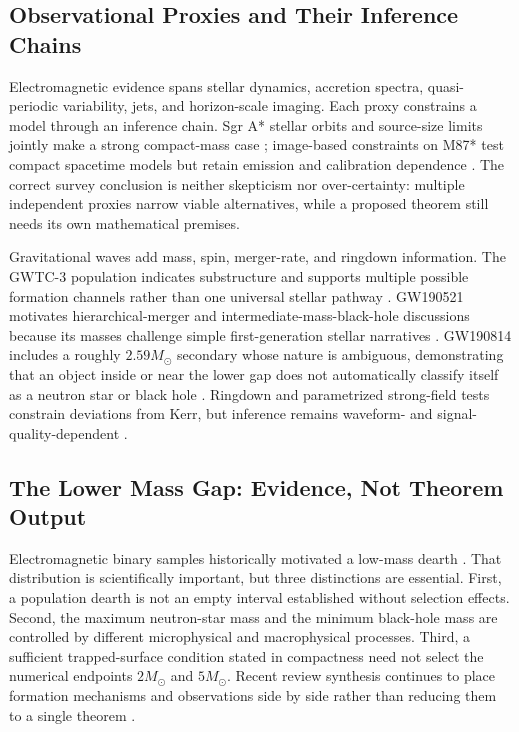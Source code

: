 \documentclass[conference]{IEEEtran}
\newcommand{\Msun}{M_{\odot}}
\begin{document}
\subsection{Observational Proxies and Their Inference Chains}
Electromagnetic evidence spans stellar dynamics, accretion spectra, quasi-periodic variability, jets, and horizon-scale imaging. Each proxy constrains a model through an inference chain. Sgr A* stellar orbits and source-size limits jointly make a strong compact-mass case \cite{genzel2010}; image-based constraints on M87* test compact spacetime models but retain emission and calibration dependence \cite{kocherlakota2021}. The correct survey conclusion is neither skepticism nor over-certainty: multiple independent proxies narrow viable alternatives, while a proposed theorem still needs its own mathematical premises.

Gravitational waves add mass, spin, merger-rate, and ringdown information. The GWTC-3 population indicates substructure and supports multiple possible formation channels rather than one universal stellar pathway \cite{abbott2023gwtc3}. GW190521 motivates hierarchical-merger and intermediate-mass-black-hole discussions because its masses challenge simple first-generation stellar narratives \cite{abbott2020gw190521}. GW190814 includes a roughly $2.59\Msun$ secondary whose nature is ambiguous, demonstrating that an object inside or near the lower gap does not automatically classify itself as a neutron star or black hole \cite{abbott2020gw190814}. Ringdown and parametrized strong-field tests constrain deviations from Kerr, but inference remains waveform- and signal-quality-dependent \cite{berti2015,yunes2016}.

\subsection{The Lower Mass Gap: Evidence, Not Theorem Output}
Electromagnetic binary samples historically motivated a low-mass dearth \cite{bailyn1998,ozel2010}. That distribution is scientifically important, but three distinctions are essential. First, a population dearth is not an empty interval established without selection effects. Second, the maximum neutron-star mass and the minimum black-hole mass are controlled by different microphysical and macrophysical processes. Third, a sufficient trapped-surface condition stated in compactness need not select the numerical endpoints $2\Msun$ and $5\Msun$. Recent review synthesis continues to place formation mechanisms and observations side by side rather than reducing them to a single theorem \cite{kushangi2026}.
\end{document}

